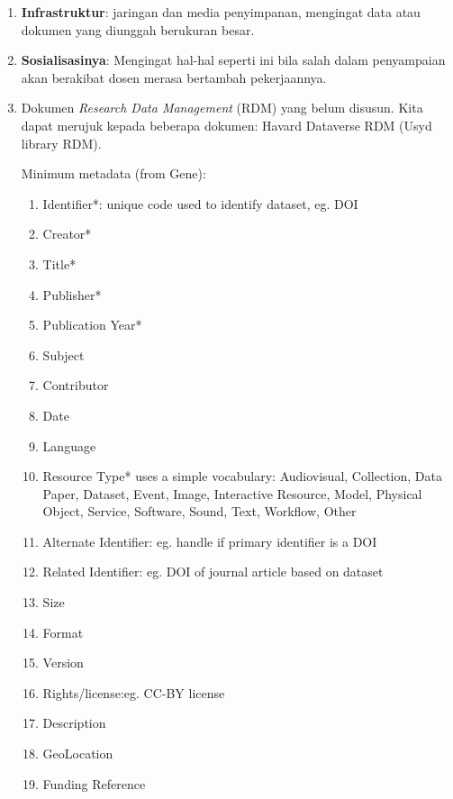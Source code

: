 \documentclass[a4paper]{article}
\begin{document}
\begin{enumerate}

\item \textbf{Infrastruktur}: jaringan dan media penyimpanan, mengingat data atau dokumen yang diunggah berukuran besar.

\item \textbf{Sosialisasinya}: Mengingat hal-hal seperti ini bila salah dalam penyampaian akan berakibat dosen merasa bertambah pekerjaannya. 


\item Dokumen \textit{Research Data Management} (RDM) yang belum disusun. Kita dapat merujuk kepada beberapa dokumen: Havard Dataverse RDM (Usyd library RDM). %

Minimum metadata (from Gene):
\begin{enumerate}

\item Identifier*: unique code used to identify dataset, eg. DOI
\item Creator*             
\item Title*
\item Publisher*
\item Publication Year*
\item Subject
\item Contributor
\item Date
\item Language
\item Resource Type* uses a simple vocabulary: Audiovisual, Collection, Data Paper, Dataset, Event, Image, Interactive Resource, Model, Physical Object, Service, Software, Sound, Text, Workflow, Other
\item Alternate Identifier: eg. handle if primary identifier is a DOI
\item Related Identifier: eg. DOI of journal article based on dataset
\item Size
\item Format
\item Version
\item Rights/license:eg. CC-BY license
\item Description
\item GeoLocation
\item Funding Reference


\end{enumerate}
\end{enumerate}
\end{document}
